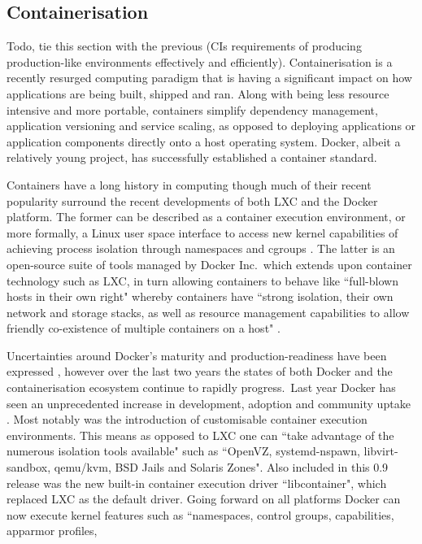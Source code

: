 \documentclass{report}
\begin{document}
\subsection{Containerisation}
Todo, tie this section with the previous (CIs requirements of producing production-like environments effectively and efficiently).
Containerisation is a recently resurged computing paradigm that is
having a significant impact on how applications are being built,
shipped and ran. Along with being less resource intensive and
more portable, containers simplify dependency management, application
versioning and service scaling, as opposed to deploying
applications or application components directly onto a host operating
system. Docker, albeit a relatively young project, has successfully
established a container standard.
\par
Containers have a long history in computing though much of their recent popularity 
surround the recent developments of both LXC and the Docker platform. 
The former can be described as a container execution environment,
or more formally, a Linux user space interface to 
access new kernel capabilities of achieving process isolation through namespaces
and cgroups \citep{Claus}. The latter is an open-source suite of tools managed by Docker Inc.\ which
extends upon container technology such as LXC, in turn 
allowing containers to behave like ``full-blown hosts in their own right" 
whereby containers have ``strong isolation, their own network and storage stacks, as well 
as resource management capabilities to allow friendly co-existence of multiple containers on a host" \citep{db}.
\par 
Uncertainties around Docker's maturity and production-readiness have been expressed \citep{Kereki, Powers, Merkel}, however 
over the last two years the states of both Docker and the containerisation ecosystem continue to rapidly progress.\
Last year Docker has seen an unprecedented increase in development, adoption and community uptake \citep{Merkel}. Most
notably was the introduction of customisable container execution environments. This means as opposed to LXC one can
``take advantage of the numerous isolation tools available" such as ``OpenVZ, systemd-nspawn, libvirt-sandbox, qemu/kvm, BSD Jails and Solaris Zones".
Also included in this 0.9 release was the new built-in container execution driver ``libcontainer", which replaced LXC as the default driver.
Going forward on all platforms Docker can now execute kernel features such as ``namespaces, control groups, capabilities, apparmor profiles, 
\end{document}
